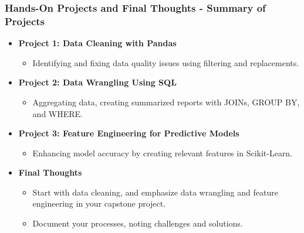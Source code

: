 \documentclass[aspectratio=169]{beamer}
\begin{document}
\begin{frame}[fragile]
    \frametitle{Hands-On Projects and Final Thoughts - Summary of Projects}
    \begin{itemize}
        \item \textbf{Project 1: Data Cleaning with Pandas}
            \begin{itemize}
                \item Identifying and fixing data quality issues using filtering and replacements.
            \end{itemize}
        
        \item \textbf{Project 2: Data Wrangling Using SQL}
            \begin{itemize}
                \item Aggregating data, creating summarized reports with JOINs, GROUP BY, and WHERE.
            \end{itemize}
        
        \item \textbf{Project 3: Feature Engineering for Predictive Models}
            \begin{itemize}
                \item Enhancing model accuracy by creating relevant features in Scikit-Learn.
            \end{itemize}
        
        \item \textbf{Final Thoughts}
            \begin{itemize}
                \item Start with data cleaning, and emphasize data wrangling and feature engineering in your capstone project.
                \item Document your processes, noting challenges and solutions.
            \end{itemize}
    \end{itemize}
\end{frame}
\end{document}
